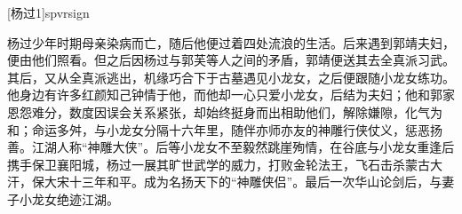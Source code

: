 \documentclass[print, doctor, vlined]{DissertUESTC}
\begin{document}

	[杨过1]{spvrsign}

	
	
	\zhabstract
	
	杨过少年时期母亲染病而亡，随后他便过着四处流浪的生活。后来遇到郭靖夫妇，便由他们照看。但之后因杨过与郭芙等人之间的矛盾，郭靖便送其去全真派习武。其后，又从全真派逃出，机缘巧合下于古墓遇见小龙女，之后便跟随小龙女练功。他身边有许多红颜知己钟情于他，而他却一心只爱小龙女，后结为夫妇；他和郭家恩怨难分，数度因误会关系紧张，却始终挺身而出相助他们，解除嫌隙，化气为和；命运多舛，与小龙女分隔十六年里，随伴亦师亦友的神雕行侠仗义，惩恶扬善。江湖人称“神雕大侠”。后等小龙女不至毅然跳崖殉情，在谷底与小龙女重逢后携手保卫襄阳城，杨过一展其旷世武学的威力，打败金轮法王，飞石击杀蒙古大汗，保大宋十三年和平。成为名扬天下的“神雕侠侣”。最后一次华山论剑后，与妻子小龙女绝迹江湖。




\end{document}
